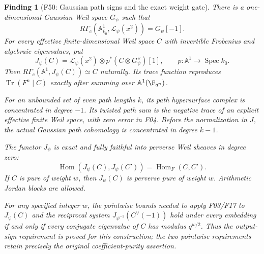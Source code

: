 \documentclass[11pt,a4paper]{article}
\newcommand{\A}{\mathbb A}\newcommand{\PP}{\mathbb P}\newcommand{\GL}{\mathrm{GL}}
\newcommand{\Hom}{\operatorname{Hom}}\newcommand{\Spec}{\operatorname{Spec}}\newcommand{\Tr}{\operatorname{Tr}}\newcommand{\rank}{\operatorname{rank}}\newcommand{\Sym}{\operatorname{Sym}}\newcommand{\Res}{\operatorname{Res}}\newcommand{\IC}{\operatorname{IC}}\newcommand{\Gr}{\operatorname{Gr}}\newcommand{\Rep}{\operatorname{Rep}}\newcommand{\Frob}{\operatorname{Frob}}\newcommand{\End}{\operatorname{End}}
\newcommand{\fid}[1]{\textsf{#1}}\newcommand{\gate}[1]{\textsf{#1}}
\theoremstyle{named}\newtheorem{finding}{Finding}[section]
\theoremstyle{definition}\newtheorem{definition}[finding]{Definition}
\theoremstyle{remark}\newtheorem{remark}[finding]{Remark}
\begin{document}
\begin{finding}[\fid{F50}: Gaussian path signs and the exact weight gate]
\label{f:gaussiansign}
There is a one-dimensional Gaussian Weil space $G_\psi$ such that
\[
 R\Gamma_c(\A^1_{\bar k_0},\mathcal L_\psi(x^2))=G_\psi[-1].
\]
For every effective finite-dimensional Weil space $C$ with invertible
Frobenius and algebraic eigenvalues, put
\[
 J_\psi(C)=\mathcal L_\psi(x^2)\otimes
                p^*(C\otimes G_\psi^\vee)[1],
 \qquad p:\A^1\longrightarrow\Spec k_0.
\]
Then $R\Gamma_c(\A^1,J_\psi(C))\simeq C$ naturally. Its trace
function reproduces $\Tr(F^n\mid C)$ exactly after summing over
$\A^1(\F_{q^n})$.

For an unbounded set of even path lengths $k$, its path
hypersurface complex is concentrated in degree $-1$. Its twisted
path sum is the negative trace of an explicit effective finite Weil
space, with zero error in \fid{F04}. Before the normalization in $J$,
the actual Gaussian path cohomology is concentrated in degree $k-1$.

The functor $J_\psi$ is exact and fully faithful into perverse
Weil sheaves in degree zero:
\[
 \Hom(J_\psi(C),J_\psi(C'))=\Hom_F(C,C').
\]
If $C$ is pure of weight $w$, then $J_\psi(C)$ is perverse pure
of weight $w$. Arithmetic Jordan blocks are allowed.

For any specified integer $w$, the pointwise bounds needed to
apply \fid{F03}/\fid{F17} to $J_\psi(C)$ and the reciprocal system
$J_{\psi^{-1}}(C^\vee(-1))$ hold under every embedding if and only if
every conjugate eigenvalue of $C$ has modulus $q^{w/2}$.
Thus the output-sign requirement is proved for this construction;
the two pointwise requirements retain precisely the original
coefficient-purity assertion.
\end{finding}
\end{document}
